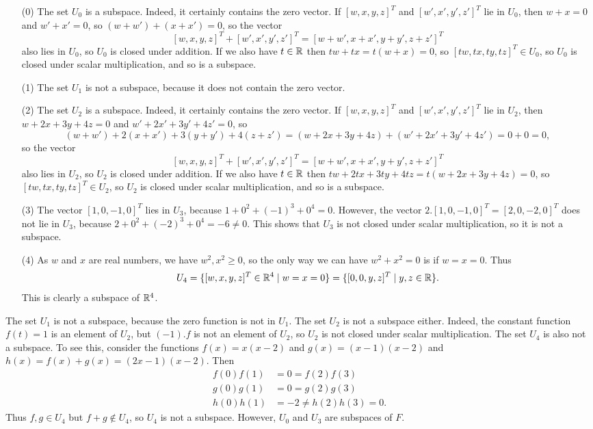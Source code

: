  \begin{itemize}
  \item[(0)] The set $U_0$ is a subspace.  Indeed, it
   certainly contains the zero vector.  If $[w,x,y,z]^T$ and
   $[w',x',y',z']^T$ lie in $U_0$, then $w+x=0$ and $w'+x'=0$,
   so $(w+w')+(x+x')=0$, so the vector
   \[ [w,x,y,z]^T+[w',x',y',z']^T=[w+w',x+x',y+y',z+z']^T \]
   also lies in $U_0$, so $U_0$ is closed under addition.
   If we also have $t\in{\mathbb{R}}$ then $tw+tx=t(w+x)=0$, so
   $[tw,tx,ty,tz]^T\in U_0$, so $U_0$ is closed under scalar
   multiplication, and so is a subspace.
  \item[(1)] The set $U_1$ is not a subspace, because it
   does not contain the zero vector.
  \item[(2)] The set $U_2$ is a subspace.  Indeed, it
   certainly contains the zero vector.  If $[w,x,y,z]^T$ and
   $[w',x',y',z']^T$ lie in $U_2$, then $w+2x+3y+4z=0$ and
   $w'+2x'+3y'+4z'=0$, so
   \[ (w+w')+2(x+x')+3(y+y')+4(z+z') =
      (w+2x+3y+4z)+(w'+2x'+3y'+4z') = 0+0 = 0,
   \]
   so the vector
   \[ [w,x,y,z]^T+[w',x',y',z']^T=[w+w',x+x',y+y',z+z']^T \]
   also lies in $U_2$, so $U_2$ is closed under addition.  If we
   also have $t\in{\mathbb{R}}$ then $tw+2tx+3ty+4tz=t(w+2x+3y+4z)=0$,
   so $[tw,tx,ty,tz]^T\in U_2$, so $U_2$ is closed under
   scalar multiplication, and so is a subspace.
  \item[(3)] The vector $[1,0,-1,0]^T$ lies in $U_3$, because
   $1+0^2+(-1)^3+0^4=0$.  However, the vector
   $2.[1,0,-1,0]^T=[2,0,-2,0]^T$ does not lie in $U_3$, because
   $2+0^2+(-2)^3+0^4=-6\neq 0$.  This shows that $U_3$ is
   not closed under scalar multiplication, so it is not a
   subspace.
  \item[(4)] As $w$ and $x$ are real numbers, we have
   $w^2,x^2\geq 0$, so the only way we can have $w^2+x^2=0$
   is if $w=x=0$.  Thus
   \[ U_4 = \{[w,x,y,z]^T\in{\mathbb{R}}^4\;|\; w=x=0\} =
            \{[0,0,y,z]^T\;|\; y,z\in{\mathbb{R}}\}.
   \]
   This is clearly a subspace of ${\mathbb{R}}^4$.
 \end{itemize}
\EndDeferredSolution

 The set $U_1$ is not a subspace, because the zero function
 is not in $U_1$.  The set $U_2$ is not a subspace either.
 Indeed, the constant function $f(t)=1$ is an element of
 $U_2$, but $(-1).f$ is not an element of $U_2$, so $U_2$ is
 not closed under scalar multiplication.  The set $U_4$ is
 also not a subspace.  To see this, consider the functions
 $f(x)=x(x-2)$ and $g(x)=(x-1)(x-2)$ and
 $h(x)=f(x)+g(x)=(2x-1)(x-2)$.  Then
 \begin{align*}
  f(0)f(1) &= 0 = f(2)f(3) \\
  g(0)g(1) &= 0 = g(2)g(3) \\
  h(0)h(1) &= -2 \neq h(2)h(3) = 0.
 \end{align*}
 Thus $f,g\in U_4$ but $f+g\not\in U_4$, so $U_4$ is not a
 subspace.  However, $U_0$ and $U_3$ are subspaces of $F$.
\EndDeferredSolution

